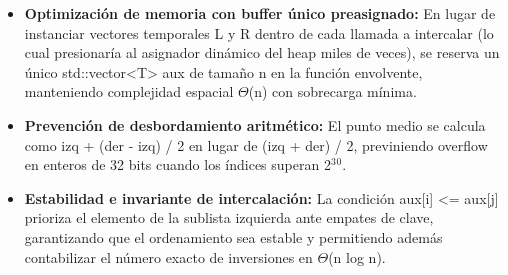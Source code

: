 \documentclass[11pt,letterpaper]{article}
\begin{document}
\begin{itemize}
\setlength{\itemsep}{2pt}\setlength{\parskip}{0pt}
  \item \textbf{Optimización de memoria con buffer único preasignado: }En lugar de instanciar vectores temporales L y R dentro de cada llamada a intercalar (lo cual presionaría al asignador dinámico del heap miles de veces), se reserva un único std::vector<T> aux de tamaño n en la función envolvente, manteniendo complejidad espacial $\Theta$(n) con sobrecarga mínima.
  \item \textbf{Prevención de desbordamiento aritmético: }El punto medio se calcula como izq + (der - izq) / 2 en lugar de (izq + der) / 2, previniendo overflow en enteros de 32 bits cuando los índices superan 2$^3$$^0$.
  \item \textbf{Estabilidad e invariante de intercalación: }La condición aux[i] <= aux[j] prioriza el elemento de la sublista izquierda ante empates de clave, garantizando que el ordenamiento sea estable y permitiendo además contabilizar el número exacto de inversiones en $\Theta$(n log n).
\end{itemize}
\end{document}
